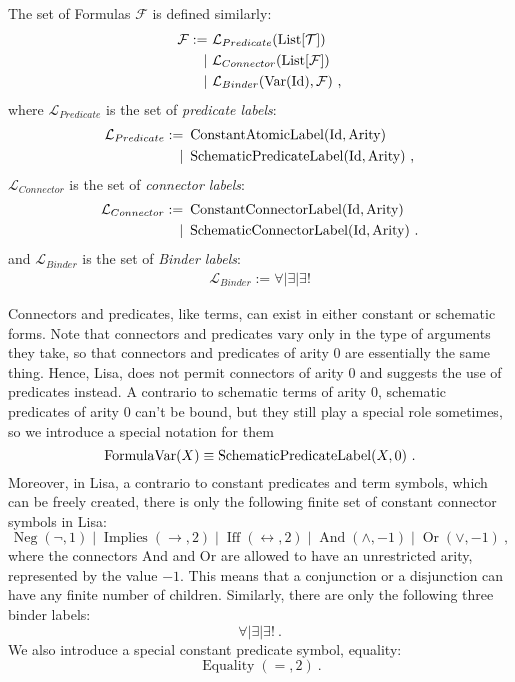 \begin{definition}[Formulas]
  The set of Formulas $\mathcal{F}$ is defined similarly:
  \begin{align}
    \mathcal{F} := & ~\mathcal{L}_{Predicate}(\operatorname{List}[\mathcal{T}])                \\
    \mid           & ~\mathcal{L}_{Connector}(\operatorname{List}[\mathcal{F}])                \\
    \mid           & ~\mathcal{L}_{Binder}(\operatorname{Var}(\textnormal{Id}), \mathcal{F})~,
  \end{align}
  where $\mathcal{L}_{Predicate}$ is the set of \textit{predicate labels}:
  \begin{align}
    \mathcal{L}_{Predicate} := & ~\operatorname{ConstantAtomicLabel}(\textnormal{Id}, \textnormal{Arity})    \\
    \mid                       & ~\operatorname{SchematicPredicateLabel}(\textnormal{Id}, \textnormal{Arity})~,
  \end{align}
  $\mathcal{L}_{Connector}$ is the set of \textit{connector labels}:
  \begin{align}
    \mathcal{L}_{Connector} := & ~\operatorname{ConstantConnectorLabel}(\textnormal{Id}, \textnormal{Arity})    \\
    \mid                       & ~\operatorname{SchematicConnectorLabel}(\textnormal{Id}, \textnormal{Arity})~.
  \end{align}
  and $\mathcal{L}_{Binder}$ is the set of \textit{Binder labels}:
  \begin{align}
    \mathcal{L}_{Binder} := \forall \mid \exists \mid \exists!
  \end{align}

  Connectors and predicates, like terms, can exist in either constant or schematic forms. Note that connectors and predicates vary only in the type of arguments they take, so that connectors and predicates of arity 0 are essentially the same thing. Hence, Lisa, does not permit connectors of arity 0 and suggests the use of predicates instead.
  A contrario to schematic terms of arity 0, schematic predicates of arity 0 can't be bound, but they still play a special role sometimes, so we introduce a special notation for them
  $$
    \operatorname{FormulaVar}(X) \equiv \operatorname{SchematicPredicateLabel}(X, 0)~.
  $$
  Moreover, in Lisa, a contrario to constant predicates and term symbols, which can be freely created, there is only the following finite set of constant connector symbols in Lisa:
  $$
    \operatorname{Neg}(\neg, 1)\mid \operatorname{Implies}(\rightarrow, 2)\mid \operatorname{Iff}(\leftrightarrow, 2)\mid \operatorname{And}(\land, -1)\mid \operatorname{Or}(\lor, -1)~,
  $$
  where the connectors And and Or are allowed to have an unrestricted arity, represented by the value $-1$. This means that a conjunction or a disjunction can have any finite number of children.
  Similarly, there are only the following three binder labels:
  $$
    \forall \mid \exists \mid \exists !~.
  $$
  We also introduce a special constant predicate symbol, equality:
  $$
    \operatorname{Equality}(=, 2)~.
  $$
\end{definition}
